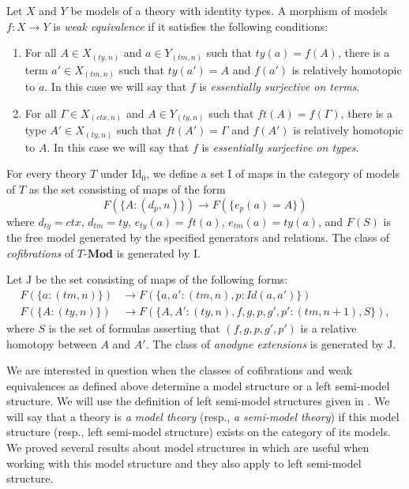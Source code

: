 \documentclass[reqno]{amsart}
\theoremstyle{definition}
\theoremstyle{remark}
\newcommand{\cat}[1]{\mathbf{#1}}
\newcommand{\Mod}[1]{#1\text{-}\cat{Mod}}
\newcommand{\IdT}{\mathrm{Id}}
\newcommand{\Id}{\mathit{Id}}
\newcommand{\ft}{\mathit{ft}}
\newcommand{\ty}{\mathit{ty}}
\newcommand{\ctx}{\mathit{ctx}}
\newcommand{\tm}{\mathit{tm}}
\newcommand{\I}{\mathrm{I}}
\newcommand{\J}{\mathrm{J}}
\numberwithin{figure}{section}
\begin{document}
Let $X$ and $Y$ be models of a theory with identity types.
A morphism of models $f : X \to Y$ is \emph{weak equivalence} if it satisfies the following conditions:
\begin{enumerate}
\item For all $A \in X_{(\ty,n)}$ and $a \in Y_{(\tm,n)}$ such that $\ty(a) = f(A)$,
there is a term $a' \in X_{(\tm,n)}$ such that $\ty(a') = A$ and $f(a')$ is relatively homotopic to $a$.
In this case we will say that $f$ is \emph{essentially surjective on terms}.
\item For all $\Gamma \in X_{(\ctx,n)}$ and $A \in Y_{(\ty,n)}$ such that $\ft(A) = f(\Gamma)$,
there is a type $A' \in X_{(\ty,n)}$ such that $\ft(A') = \Gamma$ and $f(A')$ is relatively homotopic to $A$.
In this case we will say that $f$ is \emph{essentially surjective on types}.
\end{enumerate}

For every theory $T$ under $\IdT_0$, we define a set $\I$ of maps in the category of models of $T$ as the set consisting of maps of the form
\[ F(\{ A : (d_p,n) \}) \to F(\{ e_p(a) = A \}) \]
where $d_\ty = \ctx$, $d_\tm = \ty$, $e_\ty(a) = \ft(a)$, $e_\tm(a) = \ty(a)$,
and $F(S)$ is the free model generated by the specified generators and relations.
The class of \emph{cofibrations} of $\Mod{T}$ is generated by $\I$.

Let $\J$ be the set consisting of maps of the following forms:
\begin{align*}
F(\{ a : (\tm,n) \}) & \to F(\{ a, a' : (\tm,n), p : \Id(a,a') \}) \\
F(\{ A : (\ty,n) \}) & \to F(\{ A, A' : (\ty,n), f,g,p,g',p' : (\tm,n+1), S \}),
\end{align*}
where $S$ is the set of formulas asserting that $(f,g,p,g',p')$ is a relative homotopy between $A$ and $A'$.
The class of \emph{anodyne extensions} is generated by $\J$.

We are interested in question when the classes of cofibrations and weak equivalences as defined above determine a model structure or a left semi-model structure.
We will use the definition of left semi-model structures given in \cite[Lemma~6.7]{kap-lum-model}.
We will say that a theory is \emph{a model theory} (resp., \emph{a semi-model theory}) if this model structure (resp., left semi-model structure) exists on the category of its models.
We proved several results about model structures in \cite{f-model-structures} which are useful when working with this model structure and they also apply to left semi-model structure.
\end{document}
